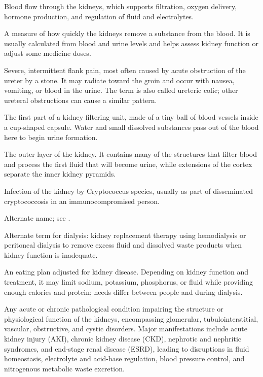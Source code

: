  Blood flow through the kidneys, which supports filtration, oxygen delivery, hormone production, and regulation of fluid and electrolytes.

 A measure of how quickly the kidneys remove a substance from the blood. It is usually calculated from blood and urine levels and helps assess kidney function or adjust some medicine doses.

 Severe, intermittent flank pain, most often caused by acute obstruction of the ureter by a stone.
It may radiate toward the groin and occur with nausea, vomiting, or blood in the urine.
The term is also called ureteric colic; other ureteral obstructions can cause a similar pattern.

 The first part of a kidney filtering unit, made of a tiny ball of blood vessels inside a cup-shaped capsule. Water and small dissolved substances pass out of the blood here to begin urine formation.

 The outer layer of the kidney. It contains many of the structures that filter blood and process the first fluid that will become urine, while extensions of the cortex separate the inner kidney pyramids.

 Infection of the kidney by Cryptococcus species, usually as part of disseminated cryptococcosis in
an immunocompromised person.

 Alternate name; see .

 Alternate term for dialysis: kidney replacement therapy using hemodialysis or peritoneal dialysis to remove excess fluid and dissolved waste products when kidney function is inadequate.

 An eating plan adjusted for kidney disease. Depending on kidney function and treatment, it may limit sodium, potassium, phosphorus, or fluid while providing enough calories and protein; needs differ between people and during dialysis.

 Any acute or chronic pathological condition impairing the structure or physiological function of the kidneys, encompassing glomerular, tubulointerstitial, vascular, obstructive, and cystic disorders. Major manifestations include acute kidney injury (AKI), chronic kidney disease (CKD), nephrotic and nephritic syndromes, and end-stage renal disease (ESRD), leading to disruptions in fluid homeostasis, electrolyte and acid-base regulation, blood pressure control, and nitrogenous metabolic waste excretion.

